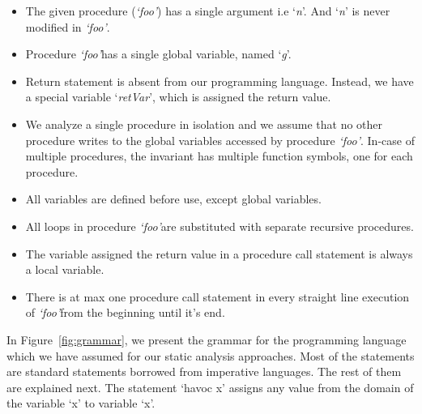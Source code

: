 \documentclass{llncs}
\newcommand{\foo}{\textit{`foo'}}
\newcommand{\retVar}{\textit{retVar}}
\newcommand{\n}{\textit{n}}
\newcommand{\g}{\textit{g}}
\begin{document}
\begin{itemize}
\item The given procedure (\foo) has a single argument i.e `\n'. And
  `\n' is never modified in \foo.
\item Procedure \foo has a single global variable, named `\g'.
\item Return statement is absent from our programming language. Instead,
  we have a special variable `\retVar', which is assigned the return
  value.
\item We analyze a single procedure in isolation and we assume that no
  other procedure writes to the global variables accessed by procedure
  \foo. In-case of multiple procedures, the invariant has multiple
  function symbols, one for each procedure. 
\item All variables are defined before use, except global variables.
\item All loops in procedure \foo are substituted with 
  separate recursive procedures.
\item The variable assigned the return value in a procedure call
  statement is always a local variable.
\item There is at max one procedure call statement in every straight line
  execution of \foo from the beginning until it's
  end.
  \end{itemize}

In Figure~\ref{fig:grammar}, we present the grammar for the
programming language which we have assumed for our static analysis
approaches.  Most of the statements are standard statements borrowed
from imperative languages. The rest of them are explained next. The
statement `havoc x' assigns any value from the domain of the variable
`x' to variable `x'.


\end{document}
